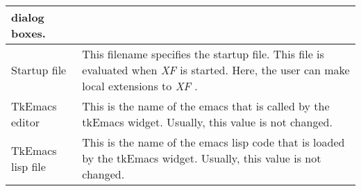 {\begin{supertabular}{|l|p{7.8cm}|}
                    dialog boxes.\\  \hline
Startup file      & This filename specifies the
                    startup file. This file is evaluated
                    when {\em XF }
 is started. Here, the user can
                    make local extensions to {\em XF}
.\\  \hline
TkEmacs editor    & This is the name of the emacs that is
                    called by the tkEmacs widget. Usually,
                    this value is not changed.\\  \hline
TkEmacs lisp file & This is the name of the emacs lisp code
                    that is loaded by the tkEmacs widget.
                    Usually, this value is not changed.\\
\end{supertabular}
}

{\newpage
\clearpage
\samepage \begin{figure}[hbt]
  \centerline{
  \epsfysize=12.5cm
  }

  \label{fig:The procedure XFProcOptionsSource}
\end{figure}
}

